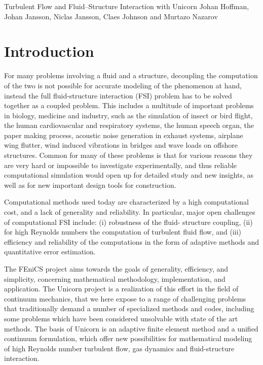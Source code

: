               {Turbulent Flow and Fluid--Structure Interaction with Unicorn}
              {Johan Hoffman, Johan Jansson, Niclas Jansson, Claes Johnson and Murtazo Nazarov}

\section{Introduction}

For many problems involving a fluid and a structure, decoupling the
computation of the two is not possible for accurate modeling of the
phenomenon at hand, instead the full fluid-structure interaction (FSI)
problem has to be solved together as a coupled problem. This includes
a multitude of important problems in biology, medicine and industry,
such as the simulation of insect or bird flight, the human
cardiovascular and respiratory systems, the human speech organ, the
paper making process, acoustic noise generation in exhaust systems,
airplane wing flutter, wind induced vibrations in bridges and wave
loads on offshore structures. Common for many of these problems is
that for various reasons they are very hard or impossible to
investigate experimentally, and thus reliable computational simulation
would open up for detailed study and new insights, as well as for new
important design tools for construction.

Computational methods used today are characterized by a high
computational cost, and a lack of generality and reliability. In
particular, major open challenges of computational FSI include: (i)
robustness of the fluid- structure coupling, (ii) for high Reynolds
numbers the computation of turbulent fluid flow, and (iii) efficiency
and reliability of the computations in the form of adaptive methods
and quantitative error estimation.

The FEniCS project aims towards the goals of generality, efficiency,
and simplicity, concerning mathematical methodology, implementation,
and application.  The Unicorn project is a realization of this effort
in the field of continuum mechanics, that we here expose to a range of
challenging problems that traditionally demand a number of specialized
methods and codes, including some problems which have been considered
unsolvable with state of the art methods.  The basis of Unicorn is an
adaptive finite element method and a unified continuum formulation,
which offer new possibilities for mathematical modeling of high
Reynolds number turbulent flow, gas dynamics and fluid-structure
interaction.

